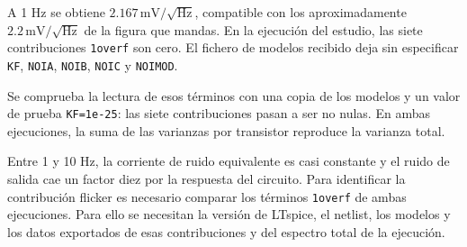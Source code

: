 \documentclass[11pt,a4paper]{article}
\begin{document}
A 1 Hz se obtiene $2.167\,\mathrm{mV}/\sqrt{\mathrm{Hz}}$, compatible con
los aproximadamente $2.2\,\mathrm{mV}/\sqrt{\mathrm{Hz}}$ de la figura que mandas.
En la ejecución del estudio, las siete contribuciones \texttt{1overf} son cero.
El fichero de modelos recibido deja sin especificar \texttt{KF},
\texttt{NOIA}, \texttt{NOIB}, \texttt{NOIC} y \texttt{NOIMOD}.

Se comprueba la lectura de esos términos con una copia de los modelos y un
valor de prueba \texttt{KF=1e-25}: las siete contribuciones pasan a ser
no nulas. En ambas ejecuciones, la suma de las varianzas por transistor
reproduce la varianza total.

Entre 1 y 10 Hz, la corriente de ruido equivalente es casi constante y el
ruido de salida cae un factor diez por la respuesta del circuito. Para
identificar la contribución flicker es necesario comparar los términos
\texttt{1overf} de ambas ejecuciones. Para ello se necesitan la versión de LTspice,
el netlist, los modelos y los datos exportados de esas contribuciones y
del espectro total de la ejecución.

%
\end{document}
